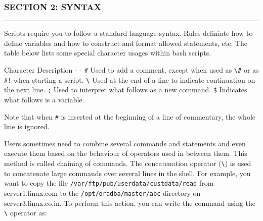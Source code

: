 \subsubsection{SECTION 2: SYNTAX}\label{section-2-syntax}

\begin{center}\rule{3in}{0.4pt}\end{center}

Scripts require you to follow a standard language syntax. Rules
deliniate how to define variables and how to construct and format
allowed statements, etc. The table below lists some special character
usages within bash scripts.

Character \textbar{} Description - \textbar{} - \texttt{\#} \textbar{}
Used to add a comment, except when used as \texttt{\textbackslash{}\#}
or as \texttt{\#!} when starting a script. \texttt{\textbackslash{}}
\textbar{} Used at the end of a line to indicate continuation on the
next line. \texttt{;} \textbar{} Used to interpret what follows as a new
command. \texttt{\$} \textbar{} Indicates what follows is a variable.

Note that when \texttt{\#} is inserted at the beginning of a line of
commentary, the whole line is ignored.

\begin{Shaded}
\begin{Highlighting}[]
\end{Highlighting}
\end{Shaded}

Users sometimes need to combine several commands and statements and even
execute them based on the behaviour of operators used in between them.
This method is called chaining of commands. The concatenation operator
(\texttt{\textbackslash{}}) is used to concatenate large commands over
several lines in the shell. For example, you want to copy the file
\texttt{/var/ftp/pub/userdata/custdata/read} from server1.linux.com to
the \texttt{/opt/oradba/master/abc} directory on server3.linux.co.in. To
perform this action, you can write the command using the
\texttt{\textbackslash{}} operator as:

\begin{Shaded}
\begin{Highlighting}[]
 
 \NormalTok{\textbackslash{}}
\NormalTok{:\textbackslash{}}
\end{Highlighting}
\end{Shaded}

